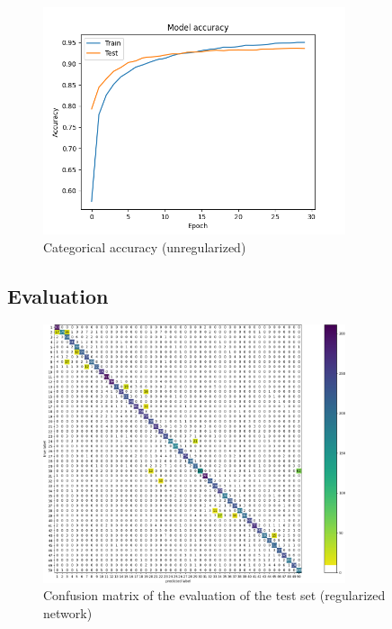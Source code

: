 \documentclass[compsoc]{IEEEtran}
\begin{document}
\begin{figure}[ht!]
\centering                                                                        
\includegraphics[width=3.5in]{../images/reg/accuracy-LeakyReLU-NoneType-categorical_crossentropy-Adam-50-256-0.1.png}
\captionsetup{justification=centering}                                                                                                                            
\caption{Categorical accuracy (unregularized)}
\label{fig:acc2}                                                                                                                                          
\end{figure} 


\subsection{Evaluation}
\begin{figure}[ht!]
\centering                                                                        
\includegraphics[width=3.5in]{regcm.png}
\captionsetup{justification=centering}
\caption{Confusion matrix of the evaluation of the test set (regularized network)}
\label{fig:regcm}
\end{figure}
\end{document}
